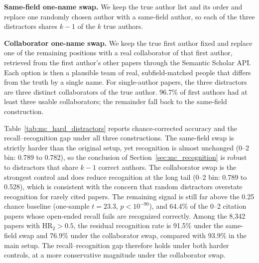 \documentclass[11pt]{article}
\begin{document}
\noindent\textbf{Same-field one-name swap.} We keep the true author list and its order and replace one randomly chosen author with a same-field author, so each of the three distractors shares $k-1$ of the $k$ true authors.

\noindent\textbf{Collaborator one-name swap.} We keep the true first author fixed and replace one of the remaining positions with a real collaborator of that first author, retrieved from the first author's other papers through the Semantic Scholar API. Each option is then a plausible team of real, subfield-matched people that differs from the truth by a single name. For single-author papers, the three distractors are three distinct collaborators of the true author. 96.7\% of first authors had at least three usable collaborators; the remainder fall back to the same-field construction.

Table~\ref{tab:mc_hard_distractors} reports chance-corrected accuracy and the recall--recognition gap under all three constructions. The same-field swap is strictly harder than the original setup, yet recognition is almost unchanged (0--2 bin: 0.789 to 0.782), so the conclusion of Section~\ref{sec:mc_recognition} is robust to distractors that share $k-1$ correct authors. The collaborator swap is the strongest control and does reduce recognition at the long tail (0--2 bin: 0.789 to 0.528), which is consistent with the concern that random distractors overstate recognition for rarely cited papers. The remaining signal is still far above the 0.25 chance baseline (one-sample $t = 23.3$, $p < 10^{-90}$), and 64.4\% of the 0--2 citation papers whose open-ended recall fails are recognized correctly. Among the 8{,}342 papers with $\text{HR}_2 > 0.5$, the residual recognition rate is 91.5\% under the same-field swap and 76.9\% under the collaborator swap, compared with 93.9\% in the main setup. The recall--recognition gap therefore holds under both harder controls, at a more conservative magnitude under the collaborator swap.

\setlength{\tabcolsep}{3pt}
\end{document}
